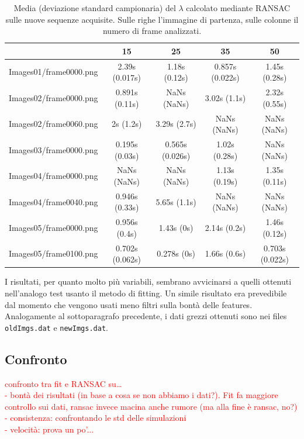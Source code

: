 \documentclass[12pt]{report}
\begin{document}
\begin{table}[H]
\begin{center}
\begin{tabular}{|c|c|c|c|c|}
	\hline
	& 15 & 25 & 35 & 50 \\ \hline
	Images01/frame0000.png & 2.39s (0.017s) & 1.18s (0.12s) & 0.857s (0.022s) & 1.45s (0.28s)\\ \hline
	Images02/frame0000.png & 0.891s (0.11s) & NaNs (NaNs) & 3.02s (1.1s) & 2.32s (0.55s)\\ \hline
	Images02/frame0060.png & 2s (1.2s) & 3.29s (2.7s) & NaNs (NaNs) & NaNs (NaNs)\\ \hline
	Images03/frame0000.png & 0.195s (0.03s) & 0.565s (0.026s) & 1.02s (0.28s) & NaNs (NaNs)\\ \hline
	Images04/frame0000.png & NaNs (NaNs) & NaNs (NaNs) & 1.13s (0.19s) & 1.35s (0.11s)\\ \hline
	Images04/frame0040.png & 0.946s (0.33s) & 5.65s (1.1s) & NaNs (NaNs) & NaNs (NaNs)\\ \hline
	Images05/frame0000.png & 0.956s (0.4s) & 1.43s (0s) & 2.14s (0.2s) & 1.46s (0.12s)\\ \hline
	Images05/frame0100.png & 0.702s (0.062s) & 0.278s (0s) & 1.66s (0.6s) & 0.703s (0.022s)\\ \hline
\end{tabular}
\caption{Media (deviazione standard campionaria) del $\lambda$ calcolato mediante RANSAC sulle nuove sequenze acquisite. Sulle righe l'immagine di partenza, sulle colonne il numero di frame analizzati.}
\label{tab:ransNew}
\end{center}
\end{table}

\noindent I risultati, per quanto molto pi\`u variabili, sembrano avvicinarsi a quelli ottenuti nell'analogo test usanto il metodo di fitting. Un simile risultato era prevedibile dal momento che vengono usati meno filtri sulla bont\`a delle features. \\

\noindent Analogamente al sottoparagrafo precedente, i  dati grezzi ottenuti sono nei files \verb|oldImgs.dat| e \verb|newImgs.dat|.




\subsection{Confronto}

\noindent \textcolor{red}{confronto tra fit e RANSAC su\dots\\
- bont\`a dei risultati (in base a cosa se non abbiamo i dati?). Fit fa maggiore controllo sui dati, ransac invece macina anche rumore (ma alla fine \`e ransac, no?) \\
- consistenza: confrontando le std delle simulazioni \\
- velocit\`a: prova un po'...}
\end{document}
